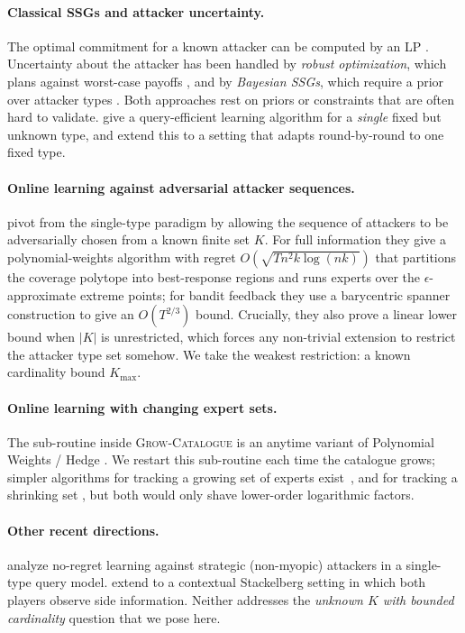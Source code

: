 \documentclass[letterpaper,9pt,twocolumn]{extarticle}
\newcommand{\Kmax}{K_{\max}}
\theoremstyle{plain}
\theoremstyle{definition}
\theoremstyle{remark}
\begin{document}
\paragraph{Classical SSGs and attacker uncertainty.}
The optimal commitment for a known attacker can be computed by an LP
\citep{conitzer2006}. Uncertainty about the attacker has been handled by
\emph{robust optimization}, which plans against worst-case payoffs
\citep{pita2010}, and by \emph{Bayesian SSGs}, which require a prior over
attacker types \citep{kiekintveld2011,marecki2012}. Both approaches rest on
priors or constraints that are often hard to validate. \citet{letchford2009}
give a query-efficient learning algorithm for a \emph{single} fixed but
unknown type, and \citet{blum2014b} extend this to a setting that adapts
round-by-round to one fixed type.

\paragraph{Online learning against adversarial attacker sequences.}
\citet{balcan2015} pivot from the single-type paradigm by allowing the
sequence of attackers to be adversarially chosen from a known finite set
$K$. For full information they give a polynomial-weights algorithm with
regret $O(\sqrt{Tn^2 k\log(nk)})$ that partitions the coverage polytope
into best-response regions and runs experts over the
$\epsilon$-approximate extreme points; for bandit feedback they use a
barycentric spanner construction to give an $O(T^{2/3})$ bound.
Crucially, they also prove a linear lower bound when $|K|$ is unrestricted,
which forces any non-trivial extension to restrict the attacker type set
somehow. We take the weakest restriction: a known cardinality bound
$\Kmax$.

\paragraph{Online learning with changing expert sets.}
The sub-routine inside \textsc{Grow-Catalogue} is an anytime variant of
Polynomial Weights / Hedge \citep{littlestone1994,freund1997,cesa2006}. We
restart this sub-routine each time the catalogue grows; simpler algorithms
for tracking a growing set of experts exist~\citep{mourtada2017}, and for
tracking a shrinking set \citep{gaillard2019}, but both would only shave
lower-order logarithmic factors.

\paragraph{Other recent directions.}
\citet{haghtalab2022} analyze no-regret learning against strategic
(non-myopic) attackers in a single-type query model. \citet{harris2024side}
extend to a contextual Stackelberg setting in which both players observe
side information. Neither addresses the \emph{unknown $K$ with bounded
cardinality} question that we pose here.
\end{document}
